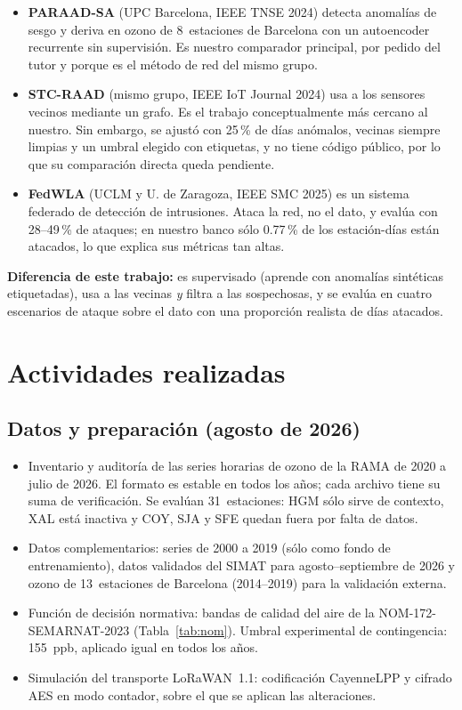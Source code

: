 \documentclass[11pt, letterpaper]{article}
\begin{document}
\begin{itemize}
  \item \textbf{PARAAD-SA} \cite{allka2024paraad} (UPC Barcelona, IEEE TNSE 2024) detecta
    anomalías de sesgo y deriva en ozono de 8~estaciones de Barcelona con un autoencoder
    recurrente sin supervisión. Es nuestro comparador principal, por pedido del tutor y
    porque es el método de red del mismo grupo.
  \item \textbf{STC-RAAD} \cite{allka2024stcraad} (mismo grupo, IEEE IoT Journal 2024) usa a
    los sensores vecinos mediante un grafo. Es el trabajo conceptualmente más cercano al
    nuestro. Sin embargo, se ajustó con 25\,\% de días anómalos, vecinas siempre limpias y
    un umbral elegido con etiquetas, y no tiene código público, por lo que su comparación
    directa queda pendiente.
  \item \textbf{FedWLA} \cite{garciasaez2025fedwla} (UCLM y U. de Zaragoza, IEEE SMC 2025)
    es un sistema federado de detección de intrusiones. Ataca la red, no el dato, y evalúa
    con 28--49\,\% de ataques; en nuestro banco sólo 0.77\,\% de los estación-días están
    atacados, lo que explica sus métricas tan altas.
\end{itemize}

\textbf{Diferencia de este trabajo:} es supervisado (aprende con anomalías sintéticas
etiquetadas), usa a las vecinas \emph{y} filtra a las sospechosas, y se evalúa en cuatro
escenarios de ataque sobre el dato con una proporción realista de días atacados.

\section{Actividades realizadas}

\subsection{Datos y preparación (agosto de 2026)}

\begin{itemize}
  \item Inventario y auditoría de las series horarias de ozono de la RAMA de 2020 a
    julio de 2026. El formato es estable en todos los años; cada archivo tiene su suma de
    verificación. Se evalúan 31~estaciones: HGM sólo sirve de contexto, XAL está
    inactiva y COY, SJA y SFE quedan fuera por falta de datos.
  \item Datos complementarios: series de 2000 a 2019 (sólo como fondo de entrenamiento),
    datos validados del SIMAT para agosto--septiembre de 2026 y ozono de 13~estaciones de
    Barcelona (2014--2019) para la validación externa.
  \item Función de decisión normativa: bandas de calidad del aire de la
    NOM-172-SEMARNAT-2023 (Tabla~\ref{tab:nom}). Umbral experimental de contingencia:
    155~ppb, aplicado igual en todos los años.
  \item Simulación del transporte LoRaWAN~1.1: codificación CayenneLPP y cifrado AES en
    modo contador, sobre el que se aplican las alteraciones.
\end{itemize}
\end{document}
